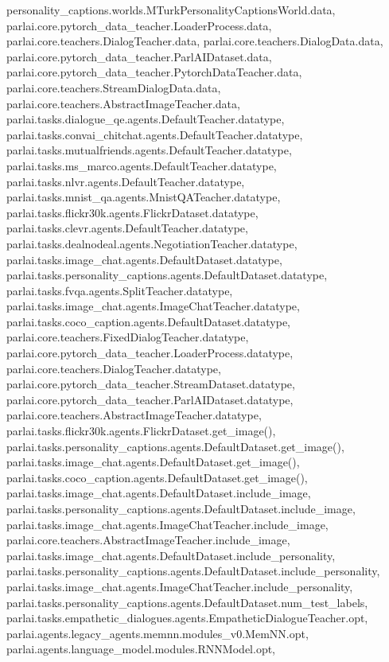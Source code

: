 personality\+\_\+captions.\+worlds.\+M\+Turk\+Personality\+Captions\+World.\+data, parlai.\+core.\+pytorch\+\_\+data\+\_\+teacher.\+Loader\+Process.\+data, parlai.\+core.\+teachers.\+Dialog\+Teacher.\+data, parlai.\+core.\+teachers.\+Dialog\+Data.\+data, parlai.\+core.\+pytorch\+\_\+data\+\_\+teacher.\+Parl\+A\+I\+Dataset.\+data, parlai.\+core.\+pytorch\+\_\+data\+\_\+teacher.\+Pytorch\+Data\+Teacher.\+data, parlai.\+core.\+teachers.\+Stream\+Dialog\+Data.\+data, parlai.\+core.\+teachers.\+Abstract\+Image\+Teacher.\+data, parlai.\+tasks.\+dialogue\+\_\+qe.\+agents.\+Default\+Teacher.\+datatype, parlai.\+tasks.\+convai\+\_\+chitchat.\+agents.\+Default\+Teacher.\+datatype, parlai.\+tasks.\+mutualfriends.\+agents.\+Default\+Teacher.\+datatype, parlai.\+tasks.\+ms\+\_\+marco.\+agents.\+Default\+Teacher.\+datatype, parlai.\+tasks.\+nlvr.\+agents.\+Default\+Teacher.\+datatype, parlai.\+tasks.\+mnist\+\_\+qa.\+agents.\+Mnist\+Q\+A\+Teacher.\+datatype, parlai.\+tasks.\+flickr30k.\+agents.\+Flickr\+Dataset.\+datatype, parlai.\+tasks.\+clevr.\+agents.\+Default\+Teacher.\+datatype, parlai.\+tasks.\+dealnodeal.\+agents.\+Negotiation\+Teacher.\+datatype, parlai.\+tasks.\+image\+\_\+chat.\+agents.\+Default\+Dataset.\+datatype, parlai.\+tasks.\+personality\+\_\+captions.\+agents.\+Default\+Dataset.\+datatype, parlai.\+tasks.\+fvqa.\+agents.\+Split\+Teacher.\+datatype, parlai.\+tasks.\+image\+\_\+chat.\+agents.\+Image\+Chat\+Teacher.\+datatype, parlai.\+tasks.\+coco\+\_\+caption.\+agents.\+Default\+Dataset.\+datatype, parlai.\+core.\+teachers.\+Fixed\+Dialog\+Teacher.\+datatype, parlai.\+core.\+pytorch\+\_\+data\+\_\+teacher.\+Loader\+Process.\+datatype, parlai.\+core.\+teachers.\+Dialog\+Teacher.\+datatype, parlai.\+core.\+pytorch\+\_\+data\+\_\+teacher.\+Stream\+Dataset.\+datatype, parlai.\+core.\+pytorch\+\_\+data\+\_\+teacher.\+Parl\+A\+I\+Dataset.\+datatype, parlai.\+core.\+teachers.\+Abstract\+Image\+Teacher.\+datatype, parlai.\+tasks.\+flickr30k.\+agents.\+Flickr\+Dataset.\+get\+\_\+image(), parlai.\+tasks.\+personality\+\_\+captions.\+agents.\+Default\+Dataset.\+get\+\_\+image(), parlai.\+tasks.\+image\+\_\+chat.\+agents.\+Default\+Dataset.\+get\+\_\+image(), parlai.\+tasks.\+coco\+\_\+caption.\+agents.\+Default\+Dataset.\+get\+\_\+image(), parlai.\+tasks.\+image\+\_\+chat.\+agents.\+Default\+Dataset.\+include\+\_\+image, parlai.\+tasks.\+personality\+\_\+captions.\+agents.\+Default\+Dataset.\+include\+\_\+image, parlai.\+tasks.\+image\+\_\+chat.\+agents.\+Image\+Chat\+Teacher.\+include\+\_\+image, parlai.\+core.\+teachers.\+Abstract\+Image\+Teacher.\+include\+\_\+image, parlai.\+tasks.\+image\+\_\+chat.\+agents.\+Default\+Dataset.\+include\+\_\+personality, parlai.\+tasks.\+personality\+\_\+captions.\+agents.\+Default\+Dataset.\+include\+\_\+personality, parlai.\+tasks.\+image\+\_\+chat.\+agents.\+Image\+Chat\+Teacher.\+include\+\_\+personality, parlai.\+tasks.\+personality\+\_\+captions.\+agents.\+Default\+Dataset.\+num\+\_\+test\+\_\+labels, parlai.\+tasks.\+empathetic\+\_\+dialogues.\+agents.\+Empathetic\+Dialogue\+Teacher.\+opt, parlai.\+agents.\+legacy\+\_\+agents.\+memnn.\+modules\+\_\+v0.\+Mem\+N\+N.\+opt, parlai.\+agents.\+language\+\_\+model.\+modules.\+R\+N\+N\+Model.\+opt, 